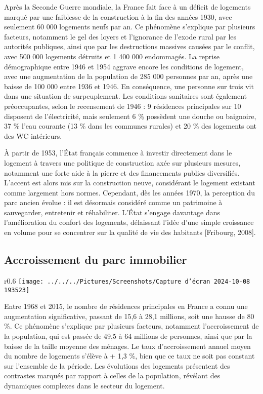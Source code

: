 \documentclass[a4paper, 12pt]{report}
\begin{document}
Après la Seconde Guerre mondiale, la France fait face à un déficit de logements marqué par une faiblesse de la construction à la fin des années 1930, avec seulement 60 000 logements neufs par an. Ce phénomène s'explique par plusieurs facteurs, notamment le gel des loyers et l'ignorance de l'exode rural par les autorités publiques, ainsi que par les destructions massives causées par le conflit, avec 500 000 logements détruits et 1 400 000 endommagés. La reprise démographique entre 1946 et 1954 aggrave encore les conditions de logement, avec une augmentation de la population de 285 000 personnes par an, après une baisse de 100 000 entre 1936 et 1946. En conséquence, une personne sur trois vit dans une situation de surpeuplement. Les conditions sanitaires sont également préoccupantes, selon le recensement de 1946 : 9 résidences principales sur 10 disposent de l'électricité, mais seulement 6 \% possèdent une douche ou baignoire, 37 \% l'eau courante (13 \% dans les communes rurales) et 20 \% des logements ont des WC intérieurs.

À partir de 1953, l'État français commence à investir directement dans le logement à travers une politique de construction axée sur plusieurs mesures, notamment une forte aide à la pierre et des financements publics diversifiés. L'accent est alors mis sur la construction neuve, considérant le logement existant comme largement hors normes. Cependant, dès les années 1970, la perception du parc ancien évolue : il est désormais considéré comme un patrimoine à sauvegarder, entretenir et réhabiliter. L'État s'engage davantage dans l'amélioration du confort des logements, délaissant l'idée d'une simple croissance en volume pour se concentrer sur la qualité de vie des habitants [Fribourg, 2008].

\subsection{Accroissement du parc immobilier}

\begin{wrapfigure}{r}{0.6\textwidth}
	\centering
\texttt{[image: ../../../Pictures/Screenshots/Capture d'écran 2024-10-08 193523]}
\end{wrapfigure}
Entre 1968 et 2015, le nombre de résidences principales en France a connu une augmentation significative, passant de 15,6 à 28,1 millions, soit une hausse de 80 \%. Ce phénomène s'explique par plusieurs facteurs, notamment l'accroissement de la population, qui est passée de 49,5 à 64 millions de personnes, ainsi que par la baisse de la taille moyenne des ménages. Le taux d'accroissement annuel moyen du nombre de logements s'élève à + 1,3 \%, bien que ce taux ne soit pas constant sur l'ensemble de la période. Les évolutions des logements présentent des contrastes marqués par rapport à celles de la population, révélant des dynamiques complexes dans le secteur du logement.
\end{document}
